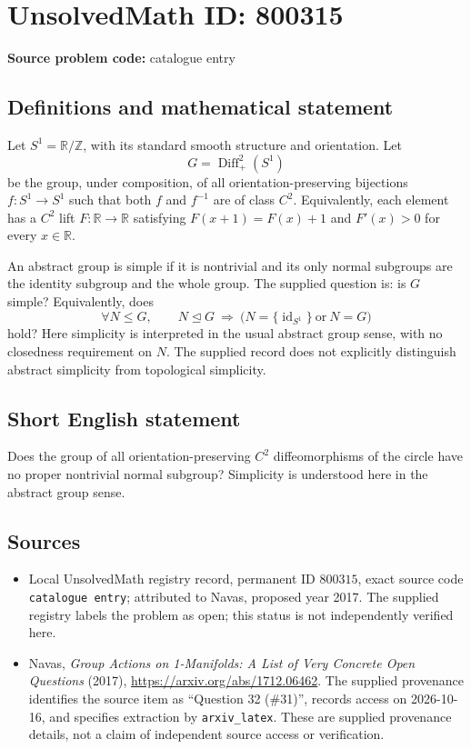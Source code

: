 \documentclass[11pt]{article}
\newcommand{\Z}{\mathbb{Z}}
\newcommand{\R}{\mathbb{R}}
\begin{document}
\section*{UnsolvedMath ID: 800315}
\textbf{Source problem code:} catalogue entry
\subsection{Definitions and mathematical statement}
Let \(S^1=\R/\Z\), with its standard smooth structure and orientation. Let
\[
G=\operatorname{Diff}^{2}_{+}(S^1)
\]
be the group, under composition, of all orientation-preserving bijections \(f:S^1\to S^1\) such that both \(f\) and \(f^{-1}\) are of class \(C^2\). Equivalently, each element has a \(C^2\) lift \(F:\R\to\R\) satisfying \(F(x+1)=F(x)+1\) and \(F'(x)>0\) for every \(x\in\R\).

An abstract group is simple if it is nontrivial and its only normal subgroups are the identity subgroup and the whole group. The supplied question is: is \(G\) simple? Equivalently, does
\[
\forall N\leq G,\qquad N\trianglelefteq G\ \Longrightarrow\ \bigl(N=\{\operatorname{id}_{S^1}\}\ \text{or}\ N=G\bigr)
\]
hold? Here simplicity is interpreted in the usual abstract group sense, with no closedness requirement on \(N\). The supplied record does not explicitly distinguish abstract simplicity from topological simplicity.
\subsection{Short English statement}
Does the group of all orientation-preserving \(C^2\) diffeomorphisms of the circle have no proper nontrivial normal subgroup? Simplicity is understood here in the abstract group sense.
\subsection{Sources}
\begin{itemize}
\item Local UnsolvedMath registry record, permanent ID \(800315\), exact source code \texttt{catalogue entry}; attributed to Navas, proposed year 2017. The supplied registry labels the problem as open; this status is not independently verified here.
\item Navas, \emph{Group Actions on 1-Manifolds: A List of Very Concrete Open Questions} (2017), \url{https://arxiv.org/abs/1712.06462}. The supplied provenance identifies the source item as ``Question 32 (\#31)'', records access on 2026-10-16, and specifies extraction by \texttt{arxiv\_latex}. These are supplied provenance details, not a claim of independent source access or verification.
\end{itemize}
\end{document}
